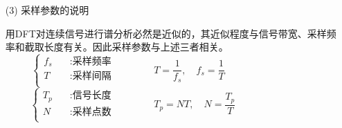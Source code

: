 \documentclass[notheorems,compress,mathserif,table]{beamer}
\begin{document}
\begin{frame}[shrink]\frametitle{}%
\begin{enumerate}
	\item [(3)]采样参数的说明\par

        用DFT对连续信号进行谱分析必然是近似的，其近似程度与信号带宽、采样频率和截取长度有关。因此采样参数与上述三者相关。
        \begin{equation*} %
            \left\{ \begin{aligned}
                f_s \quad   &: \mbox{采样频率}\\
                T   \quad   &: \mbox{采样间隔}\\                
            \end{aligned}  \right.
            \qquad\qquad   T = \frac{1}{f_s},\quad f_s = \frac{1}{T}    %
            \qquad \qquad\qquad\qquad\quad
        \end{equation*}
        \begin{equation*} %
            \left\{ \begin{aligned}
                T_p \quad   &: \mbox{信号长度}\\
                N   \quad   &: \mbox{采样点数}\\
            \end{aligned}  \right.
            \qquad\qquad  T_p  =  NT,\quad  N = \frac{T_p}{T}    %
            \qquad \qquad\qquad\qquad
        \end{equation*}
\end{enumerate}        
\end{frame}
\end{document}
